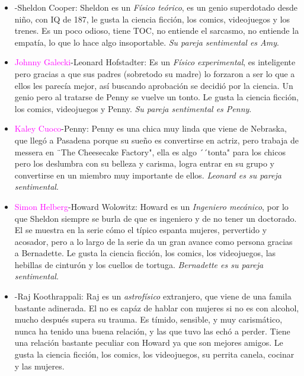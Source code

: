 \documentclass[a5paper, 11pt]{article}
\begin{document}
\begin{itemize}
    \item\textcolor{magenta}{}-Sheldon Cooper: Sheldon es un \emph{Físico teórico}, es un genio superdotado desde niño, con IQ de 187, le gusta la ciencia ficción, los comics, videojuegos y los trenes. Es un poco odioso, tiene TOC, no entiende el sarcasmo, no entiende la empatía, lo que lo hace algo insoportable. \emph{Su pareja sentimental es Amy}.
    
    \item \textcolor{magenta}{ {Johnny Galecki}}-Leonard Hofstadter: Es un \emph{Físico experimental}, es inteligente pero gracias a que sus padres (sobretodo su madre) lo forzaron a ser lo que a ellos les parecía mejor, así buscando aprobación se decidió por la ciencia. Un genio pero al tratarse de Penny se vuelve un tonto. Le gusta la ciencia ficción, los comics, videojuegos y Penny. \emph{Su pareja sentimental es Penny}.
    
    \item \textcolor{magenta}{ {Kaley Cuoco}}-Penny: Penny es una chica muy linda que viene de Nebraska, que llegó a Pasadena porque su sueño es convertirse en actriz, pero trabaja de messera en ¨The Cheesecake Factory", ella es algo ´´tonta" para los chicos pero los deslumbra con su belleza y carisma, logra entrar en su grupo y convertirse en un miembro muy importante de ellos. \emph{Leonard es su pareja sentimental}.
    
    \item \textcolor{magenta}{ {Simon Helberg}}-Howard Wolowitz: Howard es un \emph{Ingeniero mecánico}, por lo que Sheldon siempre se burla de que es ingeniero y de no tener un doctorado. El se muestra en la serie cómo el típico espanta mujeres, pervertido y acosador, pero a lo largo de la serie da un gran avance como persona gracias a Bernadette. Le gusta la ciencia ficción, los comics, los videojuegos, las hebillas de cinturón y los cuellos de tortuga. \emph{Bernadette es su pareja sentimental}.
    
    \item \textcolor{magenta}{}-Raj Koothrappali: Raj es un \emph{astrofísico} extranjero, que viene de una famila bastante adinerada. El no es capáz de hablar con mujeres si no es con alcohol, mucho después supera su trauma. Es tímido, sensible, y muy carismático, nunca ha tenido una buena relación, y las que tuvo las echó a perder. Tiene una relación bastante peculiar con Howard ya que son mejores amigos. Le gusta la ciencia ficción, los comics, los videojuegos, su perrita canela, cocinar y las mujeres.
    

\end{itemize}
\end{document}
